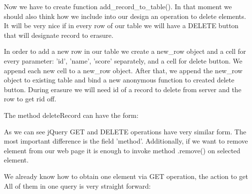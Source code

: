 Now we have to create function add\_record\_to\_table(). In that moment we should also think how we include into our design an operation to delete elements. It will be very nice if in every row of our table we will have a DELETE button that will designate record to erasure.


\begin{explain}
In order to add a new row in our table we create a new\_row object and a cell for every parameter: 'id', 'name', 'score' separately, and a cell for delete button. We append each new cell to a new\_row object. After that, we append the new\_row object to existing table and bind a new anonymous function to created delete button. During erasure we will need id of a record to delete from server and the row to get rid off.
\end{explain}

The method deleteRecord can have the form:


\begin{explain}
  As we can see jQuery GET and DELETE operations have very similar form. The most important difference is the field 'method'.  Additionally, if we want to remove element from our web page it is enough to invoke method .remove() on selected element.
\end{explain}

We already know how to obtain one element via GET operation, the action to get All of them in one query is very straight forward:

